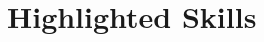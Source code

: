 \documentclass[a4paper]{moderncv}
\begin{document}
\begin{itemize}

		


		\end{itemize}

\section{Highlighted Skills}
\end{document}
